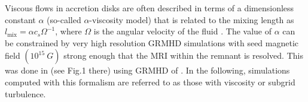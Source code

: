 Viscous flows in accretion disks are often described in terms of a dimensionless constant $\alpha$
(so-called $\alpha$-viscosity model) that is related to the mixing length as 
%
$ l_{\text{mix}} = \alpha c_s \Omega^{-1} $, 
%
where $\Omega$ is the angular velocity of the fluid \citep{Shakura:1972te}.
%
The value of $\alpha$ can be constrained by very high resolution \ac{GRMHD} simulations with seed magnetic
field $(10^{15}~G)$ strong enough that the \ac{MRI} within the remnant is resolved. 
This was done in \citet{Radice:2020ids} (see Fig.1 there) using \ac{GRMHD} of \citet{Kiuchi:2017zzg}.
%
In the following, simulations computed with this formalism are referred to as those with 
viscosity or subgrid turbulence. 
%





